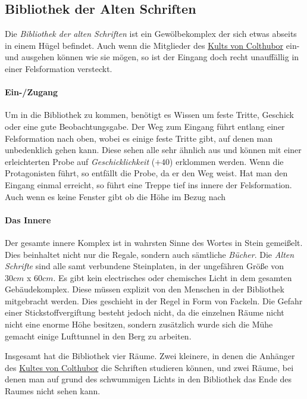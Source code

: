 \subsection{Bibliothek der Alten Schriften}
    \label{locs:bibliothek-der-alten-schriften}
    Die \emph{Bibliothek der alten Schriften} ist ein Gewölbekomplex der sich etwas abseits in einem Hügel befindet. Auch wenn die Mitglieder des \hyperref[sons:kult-von-colthubor]{Kults von Colthubor} ein- und ausgehen können wie sie mögen, so ist der Eingang doch recht unauffällig in einer Felsformation versteckt.

    \paragraph{Ein-/Zugang}
        Um in die Bibliothek zu kommen, benötigt es Wissen um feste Tritte, Geschick oder eine gute Beobachtungsgabe. Der Weg zum Eingang führt entlang einer Felsformation nach oben, wobei es einige feste Tritte gibt, auf denen man unbedenklich gehen kann. Diese sehen alle sehr ähnlich aus und können mit einer erleichterten Probe auf \emph{Geschicklichkeit} ($+40$) erklommen werden. Wenn  die Protagonisten führt, so entfällt die Probe, da er den Weg weist. Hat man den Eingang einmal erreicht, so führt eine Treppe tief ins innere der Felsformation. Auch wenn es keine Fenster gibt ob die Höhe im Bezug nach 

    \paragraph{Das Innere}
        Der gesamte innere Komplex ist in wahrsten Sinne des Wortes in Stein gemeißelt. Dies beinhaltet nicht nur die Regale, sondern auch sämtliche \emph{Bücher}. Die \emph{Alten Schrifte} sind alle samt verbundene Steinplaten, in der ungefähren Größe von $30cm$ x $60cm$. Es gibt kein electrisches oder chemisches Licht in dem gesamten Gebäudekomplex. Diese müssen explizit von den Menschen in der Bibliothek mitgebracht werden. Dies geschieht in der Regel in Form von Fackeln. Die Gefahr einer Stickstoffvergiftung besteht jedoch nicht, da die einzelnen Räume nicht nicht eine enorme Höhe besitzen, sondern zusätzlich wurde sich die Mühe gemacht einige Lufttunnel in den Berg zu arbeiten.

        Insgesamt hat die Bibliothek vier Räume. Zwei kleinere, in denen die Anhänger des \hyperref[sons:kult-von-colthubor]{Kultes von Colthubor} die Schriften studieren können, und zwei Räume, bei denen man auf grund des schwummigen Lichts in den Bibliothek das Ende des Raumes nicht sehen kann.

